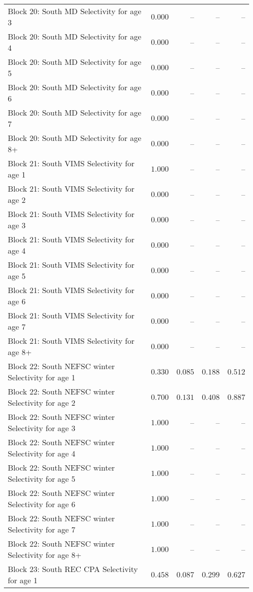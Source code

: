\documentclass[
]{article}
\begin{document}
\begin{landscape}
\begin{longtable}[t]{lrrrr}
Block 20: South MD Selectivity for age 3 & $0.000$ & -- & -- & --\\
Block 20: South MD Selectivity for age 4 & $0.000$ & -- & -- & --\\
Block 20: South MD Selectivity for age 5 & $0.000$ & -- & -- & --\\
Block 20: South MD Selectivity for age 6 & $0.000$ & -- & -- & --\\
\addlinespace
Block 20: South MD Selectivity for age 7 & $0.000$ & -- & -- & --\\
Block 20: South MD Selectivity for age 8+ & $0.000$ & -- & -- & --\\
Block 21: South VIMS Selectivity for age 1 & $1.000$ & -- & -- & --\\
Block 21: South VIMS Selectivity for age 2 & $0.000$ & -- & -- & --\\
Block 21: South VIMS Selectivity for age 3 & $0.000$ & -- & -- & --\\
\addlinespace
Block 21: South VIMS Selectivity for age 4 & $0.000$ & -- & -- & --\\
Block 21: South VIMS Selectivity for age 5 & $0.000$ & -- & -- & --\\
Block 21: South VIMS Selectivity for age 6 & $0.000$ & -- & -- & --\\
Block 21: South VIMS Selectivity for age 7 & $0.000$ & -- & -- & --\\
Block 21: South VIMS Selectivity for age 8+ & $0.000$ & -- & -- & --\\
\addlinespace
Block 22: South NEFSC winter Selectivity for age 1 & $0.330$ & $0.085$ & $0.188$ & $0.512$\\
Block 22: South NEFSC winter Selectivity for age 2 & $0.700$ & $0.131$ & $0.408$ & $0.887$\\
Block 22: South NEFSC winter Selectivity for age 3 & $1.000$ & -- & -- & --\\
Block 22: South NEFSC winter Selectivity for age 4 & $1.000$ & -- & -- & --\\
Block 22: South NEFSC winter Selectivity for age 5 & $1.000$ & -- & -- & --\\
\addlinespace
Block 22: South NEFSC winter Selectivity for age 6 & $1.000$ & -- & -- & --\\
Block 22: South NEFSC winter Selectivity for age 7 & $1.000$ & -- & -- & --\\
Block 22: South NEFSC winter Selectivity for age 8+ & $1.000$ & -- & -- & --\\
Block 23: South REC CPA Selectivity for age 1 & $0.458$ & $0.087$ & $0.299$ & $0.627$\\

\end{longtable}
\end{landscape}
\end{document}
